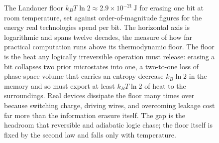 \begin{figure}[htbp]
\centering
{}
\caption[The Landauer floor against the energy budget of real storage]{The
Landauer floor $k_B T \ln 2 \approx 2.9\times10^{-21}\,\text{J}$ for erasing one
bit at room temperature, set against order-of-magnitude figures for the energy
real technologies spend per bit. The horizontal axis is logarithmic and spans
twelve decades, the measure of how far practical computation runs above its
thermodynamic floor. The floor is the heat any logically irreversible operation
must release: erasing a bit collapses two prior microstates into one, a
two-to-one loss of phase-space volume that carries an entropy decrease $k_B \ln 2$
in the memory and so must export at least $k_B T \ln 2$ of heat to the
surroundings. Real devices dissipate the floor many times over because switching
charge, driving wires, and overcoming leakage cost far more than the information
erasure itself. The gap is the headroom that reversible and adiabatic logic chase;
the floor itself is fixed by the second law and falls only with temperature.}
\label{fig:vol04ch04:landauer-erasure}
\end{figure}

